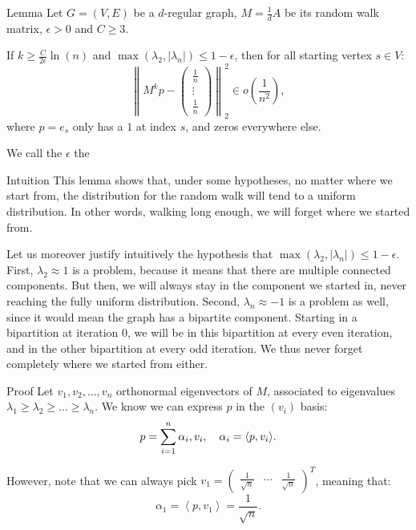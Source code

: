 \documentclass[a4paper]{article}
\begin{document}
\begin{parag}{Lemma}
    Let $G = \left(V, E\right)$ be a $d$-regular graph, $M = \frac{1}{d} A$ be its random walk matrix, $\epsilon > 0$ and $C \geq 3$. 

    If $k \geq \frac{C}{2\epsilon}\ln\left(n\right)$ and $\max\left(\lambda_2, \left|\lambda_n\right|\right) \leq 1 - \epsilon$, then for all starting vertex $s \in V$: 
    \[\left\|M^k p - \begin{pmatrix} \frac{1}{n} \\ \vdots \\ \frac{1}{n} \end{pmatrix} \right\|_2^2 \in o\left(\frac{1}{n^2}\right),\]
    where $p = e_s$ only has a $1$ at index $s$, and zeros everywhere else.
    
    We call the $\epsilon$ the 

    \begin{subparag}{Intuition}
        This lemma shows that, under some hypotheses, no matter where we start from, the distribution for the random walk will tend to a uniform distribution. In other words, walking long enough, we will forget where we started from.

        Let us moreover justify intuitively the hypothesis that $\max\left(\lambda_2, \left|\lambda_n\right|\right) \leq 1 - \epsilon$. First, $\lambda_2 \approx 1$ is a problem, because it means that there are multiple connected components. But then, we will always stay in the component we started in, never reaching the fully uniform distribution. Second, $\lambda_n \approx -1$ is a problem as well, since it would mean the graph has a bipartite component. Starting in a bipartition at iteration $0$, we will be in this bipartition at every even iteration, and in the other bipartition at every odd iteration. We thus never forget completely where we started from either.
    \end{subparag}

    \begin{subparag}{Proof}
        Let $v_1, v_2, \ldots, v_n$ orthonormal eigenvectors of $M$, associated to eigenvalues $\lambda_1 \geq \lambda_2 \geq \ldots \geq \lambda_n$. We know we can express $p$ in the $\left(v_i\right)$ basis: 
        \[p = \sum_{i=1}^{n} \alpha_i, v_i, \mathspace \alpha_i = \left\langle p, v_i \right\rangle.\]

        However, note that we can always pick $v_1 = \begin{pmatrix} \frac{1}{\sqrt{n}} & \cdots & \frac{1}{\sqrt{n}} \end{pmatrix}^T $, meaning that: 
        \[\alpha_1 = \left\langle p, v_1 \right\rangle = \frac{1}{\sqrt{n}}.\]
        

\end{subparag}
\end{parag}
\end{document}

